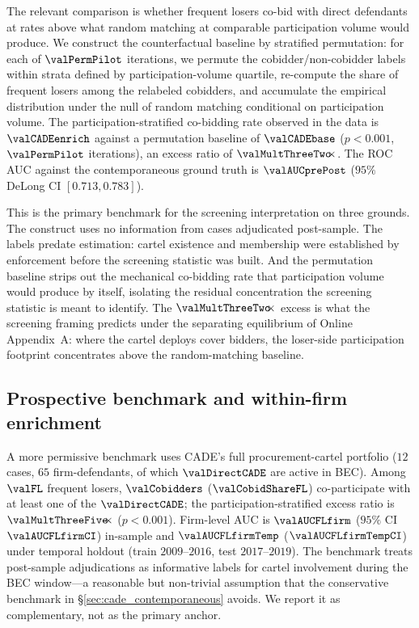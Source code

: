 The relevant comparison is whether frequent losers co-bid with
direct defendants at rates above what random matching at
comparable participation volume would produce. We construct the
counterfactual baseline by stratified permutation: for each of
$\valPermPilot$ iterations, we permute the cobidder/non-cobidder
labels within strata defined by participation-volume quartile,
re-compute the share of frequent losers among the relabeled
cobidders, and accumulate the empirical distribution under the
null of random matching conditional on participation volume.
The participation-stratified co-bidding rate observed in the
data is $\valCADEenrich$ against a permutation baseline of
$\valCADEbase$ ($p<0.001$, $\valPermPilot$ iterations), an
excess ratio of $\valMultThreeTwo\!\!\times$. The ROC AUC
against the contemporaneous ground truth is $\valAUCprePost$
($95\%$ DeLong CI $[0.713, 0.783]$).

This is the primary benchmark for the screening interpretation
on three grounds. The construct uses no information from cases
adjudicated post-sample. The labels predate estimation: cartel
existence and membership were established by enforcement before
the screening statistic was built. And the permutation baseline
strips out the mechanical co-bidding rate that participation
volume would produce by itself, isolating the residual
concentration the screening statistic is meant to identify. The
$\valMultThreeTwo\!\!\times$ excess is what the screening
framing predicts under the separating equilibrium of
Online Appendix~A: where the cartel deploys cover bidders, the
loser-side participation footprint concentrates above the
random-matching baseline.

\subsection{Prospective benchmark and within-firm enrichment}
\label{sec:cade_prospective}

A more permissive benchmark uses CADE's full procurement-cartel
portfolio ($12$ cases, $65$ firm-defendants, of which
$\valDirectCADE$ are active in BEC). Among $\valFL$ frequent
losers, $\valCobidders$ ($\valCobidShareFL$) co-participate with
at least one of the $\valDirectCADE$; the
participation-stratified excess ratio is
$\valMultThreeFive\!\!\times$ ($p<0.001$). Firm-level AUC is
$\valAUCFLfirm$ ($95\%$ CI $\valAUCFLfirmCI$) in-sample and
$\valAUCFLfirmTemp$ ($\valAUCFLfirmTempCI$) under temporal
holdout (train $2009$--$2016$, test $2017$--$2019$). The
benchmark treats post-sample adjudications as informative labels
for cartel involvement during the BEC window---a reasonable but
non-trivial assumption that the conservative benchmark in
\S\ref{sec:cade_contemporaneous} avoids. We report it as
complementary, not as the primary anchor.

